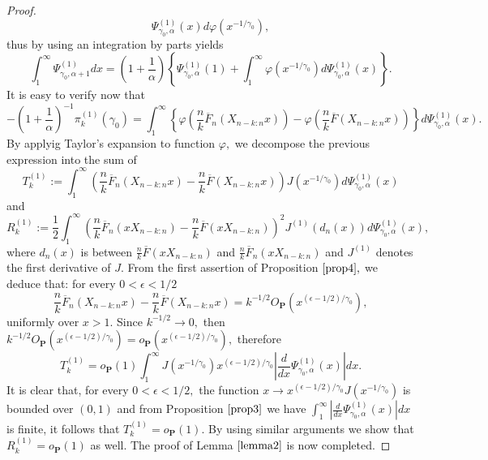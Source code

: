 \documentclass[12pt,reqno,openbib,runningheads,a4paper,portrait]{amsart}%
\begin{document}
\begin{proof}
\[\Psi_{\gamma_{0},\alpha}^{\left(  1\right)  }\left(  x\right)  d\varphi\left(
x^{-1/\gamma_{0}}\right)  ,
\]
thus by using an integration by parts yields
\[
\int_{1}^{\infty}\Psi_{\gamma_{0},\alpha+1}^{\left(  1\right)  }dx=\left(
1+\frac{1}{\alpha}\right)  \left\{  \Psi_{\gamma_{0},\alpha}^{\left(
1\right)  }\left(  1\right)  +\int_{1}^{\infty}\varphi\left(  x^{-1/\gamma
_{0}}\right)  d\Psi_{\gamma_{0},\alpha}^{\left(  1\right)  }\left(  x\right)
\right\}  .
\]
It is easy to verify now that%
\[
-\left(  1+\frac{1}{\alpha}\right)  ^{-1}\pi_{k}^{\left(  1\right)  }\left(
\gamma_{0}\right)  =\int_{1}^{\infty}\left\{  \varphi\left(  \frac{n}%
{k}\overline{F}_{n}\left(  X_{n-k:n}x\right)  \right)  -\varphi\left(
\frac{n}{k}\overline{F}\left(  X_{n-k:n}x\right)  \right)  \right\}
d\Psi_{\gamma_{0},\alpha}^{\left(  1\right)  }\left(  x\right)  .
\]
By applyig Taylor's expansion to function $\varphi,$ we decompose the previous
expression into the sum of%
\[
T_{k}^{\left(  1\right)  }:=\int_{1}^{\infty}\left(  \frac{n}{k}\overline
{F}_{n}\left(  X_{n-k:n}x\right)  -\frac{n}{k}\overline{F}\left(
X_{n-k:n}x\right)  \right)  J\left(  x^{-1/\gamma_{0}}\right)  d\Psi
_{\gamma_{0},\alpha}^{\left(  1\right)  }\left(  x\right)
\]
and%
\[
R_{k}^{\left(  1\right)  }:=\frac{1}{2}\int_{1}^{\infty}\left(  \frac{n}%
{k}\overline{F}_{n}\left(  xX_{n-k:n}\right)  -\frac{n}{k}\overline{F}\left(
xX_{n-k:n}\right)  \right)  ^{2}J^{\left(  1\right)  }\left(  d_{n}\left(
x\right)  \right)  d\Psi_{\gamma_{0},\alpha}^{\left(  1\right)  }\left(
x\right)  ,
\]
where $d_{n}\left(  x\right)  $ is between $\frac{n}{k}\overline{F}\left(
xX_{n-k:n}\right)  $ and $\frac{n}{k}\overline{F}_{n}\left(  xX_{n-k:n}%
\right)  $ and $J^{\left(  1\right)  }$ denotes the first derivative of $J.$
From the first assertion of Proposition $\ref{prop4},$ we deduce that: for
every $0<\epsilon<1/2$%
\[
\frac{n}{k}\overline{F}_{n}\left(  X_{n-k:n}x\right)  -\frac{n}{k}\overline
{F}\left(  X_{n-k:n}x\right)  =k^{-1/2}O_{\mathbf{P}}\left(  x^{\left(
\epsilon-1/2\right)  /\gamma_{0}}\right)  ,
\]
uniformly over $x>1.$ Since $k^{-1/2}\rightarrow0,$ then $k^{-1/2}%
O_{\mathbf{P}}\left(  x^{\left(  \epsilon-1/2\right)  /\gamma_{0}}\right)
=o_{\mathbf{P}}\left(  x^{\left(  \epsilon-1/2\right)  /\gamma_{0}}\right)  ,$
therefore%
\[
T_{k}^{\left(  1\right)  }=o_{\mathbf{P}}\left(  1\right)  \int_{1}^{\infty
}J\left(  x^{-1/\gamma_{0}}\right)  x^{\left(  \epsilon-1/2\right)
/\gamma_{0}}\left\vert \frac{d}{dx}\Psi_{\gamma_{0},\alpha}^{\left(  1\right)
}\left(  x\right)  \right\vert dx.
\]
It is clear that, for every $0<\epsilon<1/2,$ the function $x\rightarrow
x^{\left(  \epsilon-1/2\right)  /\gamma_{0}}J\left(  x^{-1/\gamma_{0}}\right)
$ is bounded over $\left(  0,1\right)  $ and from Proposition $\ref{prop3}$ we
have $\int_{1}^{\infty}\left\vert \frac{d}{dx}\Psi_{\gamma_{0},\alpha
}^{\left(  1\right)  }\left(  x\right)  \right\vert dx$ is finite, it follows
that $T_{k}^{\left(  1\right)  }=o_{\mathbf{P}}\left(  1\right)  .$ By using
similar arguments we show that $R_{k}^{\left(  1\right)  }=o_{\mathbf{P}%
}\left(  1\right)  $ as well. The proof of Lemma $\ref{lemma2}$ is now completed.
\end{proof}
\end{document}
